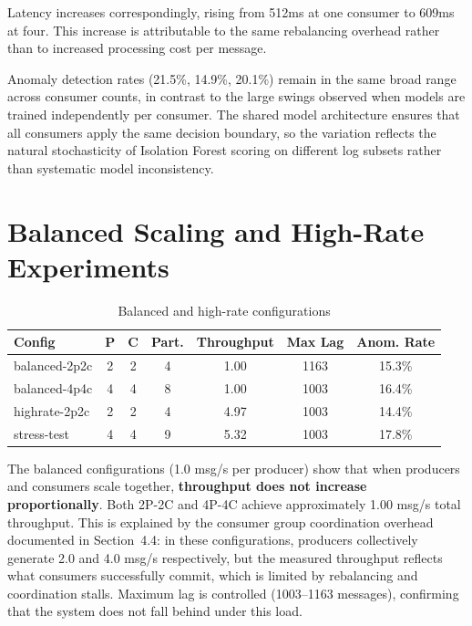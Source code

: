\documentclass[12pt,a4paper]{report}
\begin{document}
Latency increases correspondingly, rising from 512ms at one consumer to 609ms at four.
This increase is attributable to the same rebalancing overhead rather than to increased
processing cost per message.

Anomaly detection rates (21.5\%, 14.9\%, 20.1\%) remain in the same broad range across
consumer counts, in contrast to the large swings observed when models are trained
independently per consumer. The shared model architecture ensures that all consumers apply
the same decision boundary, so the variation reflects the natural stochasticity of
Isolation Forest scoring on different log subsets rather than systematic model inconsistency.

\section{Balanced Scaling and High-Rate Experiments}

\begin{table}[htbp]
\centering
\small
\caption{Balanced and high-rate configurations}
\label{tab:balanced}
\begin{tabular}{@{}lcccccc@{}}
\hline
\textbf{Config} & \textbf{P} & \textbf{C} & \textbf{Part.} & \textbf{Throughput} &
\textbf{Max Lag} & \textbf{Anom. Rate} \\
\hline
balanced-2p2c & 2 & 2 & 4 & 1.00 & 1163 & 15.3\% \\
balanced-4p4c & 4 & 4 & 8 & 1.00 & 1003 & 16.4\% \\
highrate-2p2c & 2 & 2 & 4 & 4.97 & 1003 & 14.4\% \\
stress-test   & 4 & 4 & 9 & 5.32 & 1003 & 17.8\% \\
\hline
\end{tabular}
\end{table}

The balanced configurations (1.0 msg/s per producer) show that when producers and
consumers scale together, \textbf{throughput does not increase proportionally}. Both
2P-2C and 4P-4C achieve approximately 1.00 msg/s total throughput. This is explained
by the consumer group coordination overhead documented in Section~4.4: in these
configurations, producers collectively generate 2.0 and 4.0 msg/s respectively, but
the measured throughput reflects what consumers successfully commit, which is limited
by rebalancing and coordination stalls. Maximum lag is controlled (1003--1163 messages),
confirming that the system does not fall behind under this load.
\end{document}
